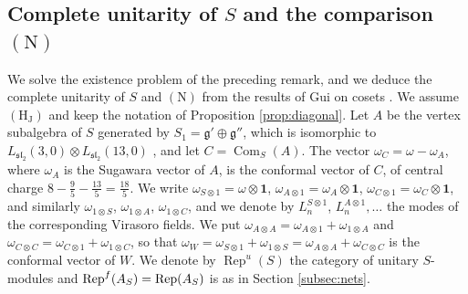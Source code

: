 \documentclass[leqno]{article}
\let\cal\relax
\newcommand{\cal}{\mathcal}
\newcommand{\ot}{\otimes}
\DeclareMathOperator{\Rep}{Rep} %
\numberwithin{equation}{section}
\begin{document}
\subsection{Complete unitarity of \texorpdfstring{$S$}{S} and the comparison \texorpdfstring{$\mathrm{(N)}$}{(N)}}
\label{subsec:complete-unitarity}

We solve the existence problem of the preceding remark, and we deduce the complete unitarity of $S$ and $\mathrm{(N)}$ from the results of Gui on cosets \cite{Gui26,Gui25}. We assume $\mathrm{(H_J)}$ and keep the notation of Proposition \ref{prop:diagonal}. Let $A$ be the vertex subalgebra of $S$ generated by $S_1 = \mathfrak g' \oplus \mathfrak g''$, which is isomorphic to $L_{\mathfrak{sl}_2}(3,0) \ot L_{\mathfrak{sl}_2}(13,0)$ \cite[Corollary 9.2]{Arh26}, and let $C = \operatorname{Com}_S(A)$. The vector $\omega_C = \omega-\omega_A$, where $\omega_A$ is the Sugawara vector of $A$, is the conformal vector of $C$, of central charge $8-\frac95-\frac{13}{5} = \frac{18}{5}$. We write $\omega_{S \ot 1} = \omega \ot \mathbf 1$, $\omega_{A \ot 1} = \omega_A \ot \mathbf 1$, $\omega_{C \ot 1} = \omega_C \ot \mathbf 1$, and similarly $\omega_{1 \ot S}$, $\omega_{1 \ot A}$, $\omega_{1 \ot C}$, and we denote by $L_n^{S \ot 1}$, $L_n^{A \ot 1}, \ldots$ the modes of the corresponding Virasoro fields. We put $\omega_{A \ot A} = \omega_{A \ot 1}+\omega_{1 \ot A}$ and $\omega_{C \ot C} = \omega_{C \ot 1}+\omega_{1 \ot C}$, so that $\omega_W = \omega_{S \ot 1}+\omega_{1 \ot S} = \omega_{A \ot A}+\omega_{C \ot C}$ is the conformal vector of $W$. We denote by $\Rep^u(S)$ the category of unitary $S$-modules \cite[Section 3.4 p.~44]{Gui26} and $\Rep^f(\cal A_S) = \Rep(\cal A_S)$ is as in Section \ref{subsec:nets}.
\end{document}
